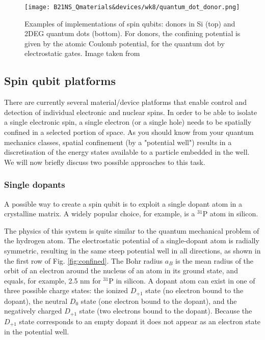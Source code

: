 \documentclass[a4paper,11pt]{article}
\begin{document}
\begin{figure}[h]
\centering
\texttt{[image: B21NS\_Qmaterials\&devices/wk8/quantum\_dot\_donor.png]}
\caption{Examples of implementations of spin qubits: donors in Si (top) and 2DEG quantum dots (bottom). For donors, the confining potential is given by the atomic Coulomb potential, for the quantum dot by electrostatic gates. Image taken from \cite{morton_embracing_2011}}
\label{fig:QD_donor}
\end{figure}

\subsection {Spin qubit platforms}
There are currently several material/device platforms that enable control and detection of individual electronic and nuclear spins. In order to be able to isolate a single electronic spin, a single electron (or a single hole) needs to be spatially confined in a selected portion of space. As you should know from your quantum mechanics classes, spatial confinement (by a "potential well") results in a discretisation of the energy states available to a particle embedded in the well.
\newline We will now briefly discuss two possible approaches to this task.
\subsubsection {Single dopants}
A possible way to create a spin qubit is to exploit a single dopant atom in a crystalline matrix. A widely popular choice, for example, is a $^{31}$P atom in silicon.

The physics of this system is quite similar to the quantum mechanical problem of the hydrogen atom. The electrostatic potential of a single-dopant atom is radially symmetric, resulting in the same steep potential well in all directions, as shown in the first row of Fig. \ref{fig:confined}. The Bohr radius $a_B$ is the mean radius of the orbit of an
electron around the nucleus of an atom in its ground state, and equals, for example, 2.5 nm for $^{31}$P in silicon. A dopant atom can exist in one of three possible charge states: the ionized $D_{+1}$ state (no electron bound to the dopant), the neutral $D_0$ state (one electron bound to the dopant), and the negatively charged $D_{+1}$ state (two electrons bound to the dopant). Because the $D_{+1}$ state corresponds to an empty dopant it does not appear as an electron state in the potential well. 
\end{document}
